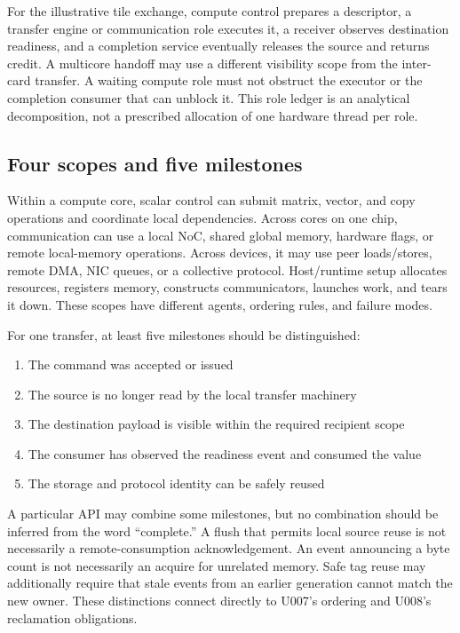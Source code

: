 For the illustrative tile exchange, compute control prepares a descriptor, a transfer engine or communication role executes it, a receiver observes destination readiness, and a completion service eventually releases the source and returns credit. A multicore handoff may use a different visibility scope from the inter-card transfer. A waiting compute role must not obstruct the executor or the completion consumer that can unblock it. This role ledger is an analytical decomposition, not a prescribed allocation of one hardware thread per role.

\subsection{Four scopes and five milestones}

Within a compute core, scalar control can submit matrix, vector, and copy operations and coordinate local dependencies. Across cores on one chip, communication can use a local NoC, shared global memory, hardware flags, or remote local-memory operations. Across devices, it may use peer loads/stores, remote DMA, NIC queues, or a collective protocol. Host/runtime setup allocates resources, registers memory, constructs communicators, launches work, and tears it down. These scopes have different agents, ordering rules, and failure modes.

For one transfer, at least five milestones should be distinguished:
\begin{enumerate}
 \item The command was accepted or issued
 \item The source is no longer read by the local transfer machinery
 \item The destination payload is visible within the required recipient scope
 \item The consumer has observed the readiness event and consumed the value
 \item The storage and protocol identity can be safely reused
\end{enumerate}
A particular API may combine some milestones, but no combination should be inferred from the word ``complete.'' A flush that permits local source reuse is not necessarily a remote-consumption acknowledgement. An event announcing a byte count is not necessarily an acquire for unrelated memory. Safe tag reuse may additionally require that stale events from an earlier generation cannot match the new owner. These distinctions connect directly to U007's ordering and U008's reclamation obligations.

